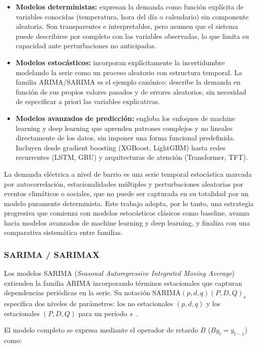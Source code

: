 \documentclass[12pt, a4paper]{article}
\begin{document}
\begin{itemize}
    \item \textbf{Modelos deterministas:} expresan la demanda como función explícita de variables conocidas (temperatura, hora del día o calendario) sin componente aleatoria. Son transparentes e interpretables, pero asumen que el sistema puede describirse por completo con las variables observadas, lo que limita su capacidad ante perturbaciones no anticipadas.
    \item \textbf{Modelos estocásticos:} incorporan explícitamente la incertidumbre modelando la serie como un proceso aleatorio con estructura temporal. La familia ARIMA/SARIMA es el ejemplo canónico: describe la demanda en función de sus propios valores pasados y de errores aleatorios, sin necesidad de especificar a priori las variables explicativas.
    \item \textbf{Modelos avanzados de predicción:} engloba los enfoques de machine learning y deep learning que aprenden patrones complejos y no lineales directamente de los datos, sin imponer una forma funcional predefinida. Incluyen desde gradient boosting (XGBoost, LightGBM) hasta redes recurrentes (LSTM, GRU) y arquitecturas de atención (Transformer, TFT).
\end{itemize}

La demanda eléctrica a nivel de barrio es una serie temporal estocástica marcada por autocorrelación, estacionalidades múltiples y perturbaciones aleatorias por eventos climáticos o sociales, que no puede ser capturada en su totalidad por un modelo puramente determinista. Este trabajo adopta, por lo tanto, una estrategia progresiva que comienza con modelos estocásticos clásicos como baseline, avanza hacia modelos avanzados de machine learning y deep learning, y finaliza con una comparativa sistemática entre familias.

\subsubsection{SARIMA / SARIMAX}

Los modelos SARIMA (\textit{Seasonal Autoregressive Integrated Moving Average}) extienden la familia ARIMA incorporando términos estacionales que capturan dependencias periódicas en la serie. Su notación SARIMA$(p, d, q)(P, D, Q)_s$ especifica dos niveles de parámetros: los no estacionales $(p, d, q)$ y los estacionales $(P, D, Q)$ para un período $s$~\cite{hyndman2021, boxjenkins2015}.

El modelo completo se expresa mediante el operador de retardo $B$ ($B y_t = y_{t-1}$) como:
\end{document}
